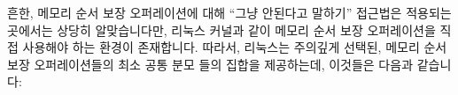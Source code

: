 흔한, 메모리 순서 보장 오퍼레이션에 대해 ``그냥 안된다고 말하기'' 접근법은
적용되는 곳에서는 상당히 알맞습니다만, 리눅스 커널과 같이 메모리 순서 보장
오퍼레이션을 직접 사용해야 하는 환경이 존재합니다.
따라서, 리눅스는 주의깊게 선택된, 메모리 순서 보장 오퍼레이션들의 최소 공통
분모 들의 집합을 제공하는데, 이것들은 다음과 같습니다:

